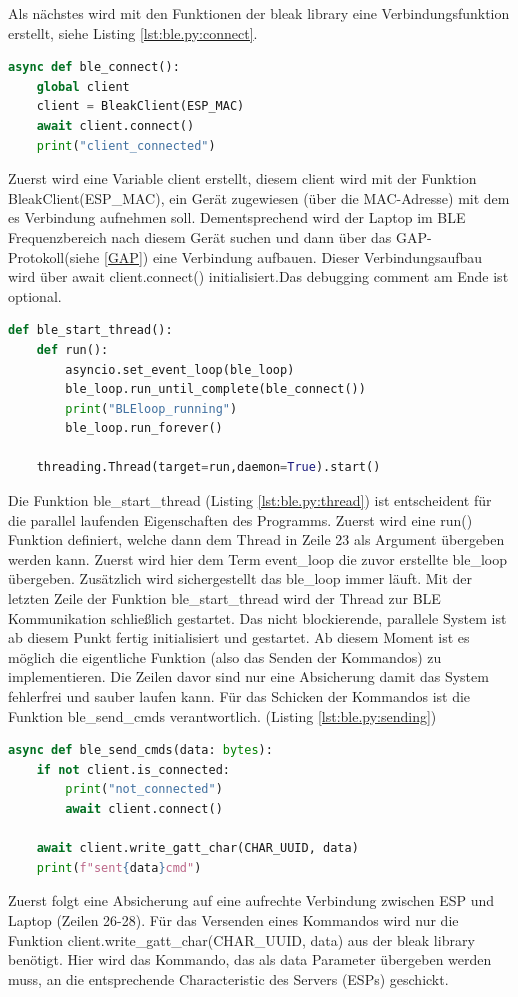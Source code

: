 \noindent
Als nächstes wird mit den Funktionen der bleak library eine Verbindungsfunktion erstellt, siehe Listing \ref{lst:ble.py:connect}.
\begin{lstlisting}[language=Python, caption={Funktion zur Verbindung mit ESP über BLE},label={lst:ble.py:connect},firstnumber=9]
async def ble_connect():
    global client 
    client = BleakClient(ESP_MAC)
    await client.connect()
    print("client_connected") 
\end{lstlisting}

\noindent
Zuerst wird eine Variable client erstellt, diesem client wird mit der Funktion BleakClient(ESP\_MAC), ein Gerät zugewiesen 
(über die MAC-Adresse) mit dem es Verbindung aufnehmen soll. Dementsprechend wird der Laptop im BLE Frequenzbereich nach diesem 
Gerät suchen und dann über das GAP-Protokoll(siehe \ref{GAP}) eine Verbindung aufbauen. Dieser Verbindungsaufbau wird über
await client.connect() initialisiert.Das debugging comment am Ende ist optional. 
\begin{lstlisting}[language=Python, caption={Erstellen und Starten des BLE Threads},label={lst:ble.py:thread},firstnumber=16]
def ble_start_thread():
    def run():
        asyncio.set_event_loop(ble_loop)
        ble_loop.run_until_complete(ble_connect())
        print("BLEloop_running")
        ble_loop.run_forever()
    
    threading.Thread(target=run,daemon=True).start()
\end{lstlisting}
\noindent
Die Funktion ble\_start\_thread (Listing \ref{lst:ble.py:thread}) ist entscheident für die parallel laufenden 
Eigenschaften des Programms. Zuerst wird eine run() Funktion definiert, welche dann dem Thread in Zeile 23 als 
Argument übergeben werden kann. Zuerst wird hier dem Term event\_loop die zuvor erstellte ble\_loop übergeben. 
Zusätzlich wird sichergestellt das ble\_loop immer läuft. Mit der letzten Zeile der Funktion ble\_start\_thread wird
der Thread zur BLE Kommunikation schließlich gestartet. 
Das nicht blockierende, parallele System ist ab diesem Punkt fertig initialisiert und gestartet. Ab diesem Moment
ist es möglich die eigentliche Funktion (also das Senden der Kommandos) zu implementieren. Die Zeilen davor sind nur eine
Absicherung damit das System fehlerfrei und sauber laufen kann. 
\noindent
Für das Schicken der Kommandos ist die Funktion ble\_send\_cmds verantwortlich. (Listing \ref{lst:ble.py:sending})
\begin{lstlisting}[language=Python, caption={Kommandos über BLE Schnittstelle versenden},label={lst:ble.py:sending},firstnumber=25]
async def ble_send_cmds(data: bytes):   
    if not client.is_connected:
        print("not_connected")
        await client.connect()
    
    await client.write_gatt_char(CHAR_UUID, data)
    print(f"sent{data}cmd") 
\end{lstlisting}
\noindent
Zuerst folgt eine Absicherung auf eine aufrechte Verbindung zwischen ESP und Laptop (Zeilen 26-28).
Für das Versenden eines Kommandos wird nur die Funktion client.write\_gatt\_char(CHAR\_UUID, data)
aus der bleak library benötigt. Hier wird das Kommando, das als data Parameter übergeben werden muss, an
die entsprechende Characteristic des Servers (ESPs) geschickt. 

